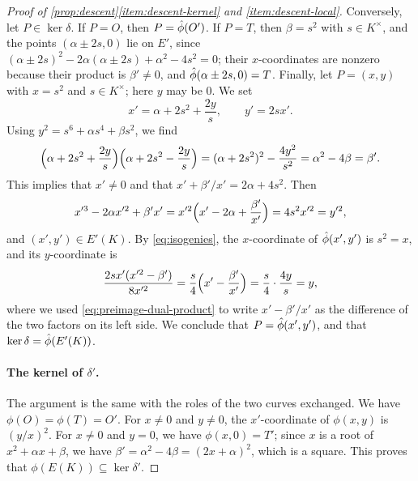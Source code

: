 \begin{proof}[Proof of \cref{prop:descent}\ref{item:descent-kernel} and \ref{item:descent-local}]
Conversely, let $P\in\ker\delta$. If $P=O$, then $P=\hat\phi(O')$. If $P=T$, then $\beta=s^2$ with $s\in K^\times$, and the points $(\alpha\pm2s,0)$ lie on $E'$, since $(\alpha\pm2s)^2-2\alpha(\alpha\pm2s)+\alpha^2-4s^2=0$; their $x$-coordinates are nonzero because their product is $\beta'\ne0$, and $\hat\phi(\alpha\pm2s,0)=T$. Finally, let $P=(x,y)$ with $x=s^2$ and $s\in K^\times$; here $y$ may be $0$. We set
\begin{equation}\label{eq:preimage-dual}
x'=\alpha+2s^2+\frac{2y}{s},\qquad y'=2sx'.
\end{equation}
Using $y^2=s^6+\alpha s^4+\beta s^2$, we find
\begin{equation}\label{eq:preimage-dual-product}
\Bigl(\alpha+2s^2+\frac{2y}s\Bigr)\Bigl(\alpha+2s^2-\frac{2y}s\Bigr)=(\alpha+2s^2)^2-\frac{4y^2}{s^2}=\alpha^2-4\beta=\beta'.
\end{equation}
This implies that $x'\ne0$ and that $x'+\beta'/x'=2\alpha+4s^2$. Then
\begin{equation}
x'^3-2\alpha x'^2+\beta'x'=x'^2\Bigl(x'-2\alpha+\frac{\beta'}{x'}\Bigr)=4s^2x'^2=y'^2,
\end{equation}
and $(x',y')\in E'(K)$. By \eqref{eq:isogenies}, the $x$-coordinate of $\hat\phi(x',y')$ is $s^2=x$, and its $y$-coordinate is
\begin{equation}
\frac{2sx'(x'^2-\beta')}{8x'^2}=\frac s4\Bigl(x'-\frac{\beta'}{x'}\Bigr)=\frac s4\cdot\frac{4y}s=y,
\end{equation}
where we used \eqref{eq:preimage-dual-product} to write $x'-\beta'/x'$ as the difference of the two factors on its left side. We conclude that $P=\hat\phi(x',y')$, and that $\ker\delta=\hat\phi(E'(K))$.

\paragraph{The kernel of $\delta'$.} The argument is the same with the roles of the two curves exchanged. We have $\phi(O)=\phi(T)=O'$. For $x\ne0$ and $y\ne0$, the $x'$-coordinate of $\phi(x,y)$ is $(y/x)^2$. For $x\ne0$ and $y=0$, we have $\phi(x,0)=T'$; since $x$ is a root of $x^2+\alpha x+\beta$, we have $\beta'=\alpha^2-4\beta=(2x+\alpha)^2$, which is a square. This proves that $\phi(E(K))\subseteq\ker\delta'$.


\end{proof}
